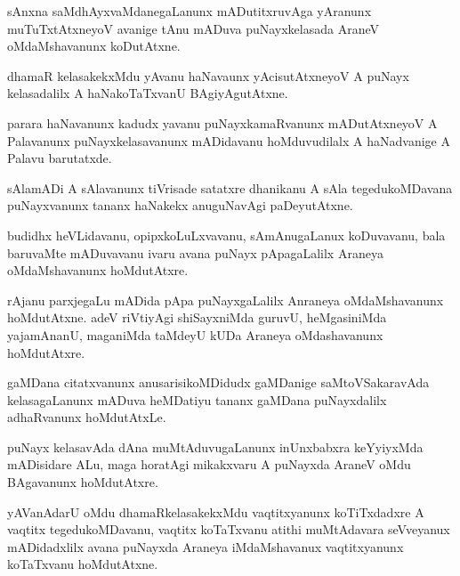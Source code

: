 \documentclass{article}
\begin{document}
\begin{mn}%
sAnxna saMdhAyxvaMdanegaLanunx mADutitxruvAga yAranunx muTuTxtAtxneyoV avanige tAnu mADuva 
puNayxkelasada AraneV oMdaMshavanunx koDutAtxne.
\end{mn}

\begin{mn}%
dhamaR kelasakekxMdu yAvanu haNavaunx yAcisutAtxneyoV A puNayx kelasadalilx A haNakoTaTxvanU 
BAgiyAgutAtxne.
\end{mn}

\begin{mn}%
parara haNavanunx kadudx yavanu puNayxkamaRvanunx mADutAtxneyoV A Palavanunx puNayxkelasavanunx 
mADidavanu hoMduvudilalx A haNadvanige A Palavu barutatxde.
\end{mn}

\begin{mn}%
sAlamADi A sAlavanunx tiVrisade satatxre dhanikanu A sAla tegedukoMDavana puNayxvanunx tananx 
haNakekx anuguNavAgi paDeyutAtxne.
\end{mn}

\begin{mn}%
budidhx heVLidavanu, opipxkoLuLxvavanu, sAmAnugaLanux koDuvavanu, bala baruvaMte mADuvavanu ivaru 
avana puNayx pApagaLalilx Araneya oMdaMshavanunx hoMdutAtxre.
\end{mn}

\begin{mn}%
rAjanu parxjegaLu mADida pApa puNayxgaLalilx Anraneya oMdaMshavanunx hoMdutAtxne. adeV riVtiyAgi 
shiSayxniMda guruvU, heMgasiniMda yajamAnanU, maganiMda taMdeyU kUDa Araneya oMdashavanunx 
hoMdutAtxre.
\end{mn}

\begin{mn}%
gaMDana citatxvanunx anusarisikoMDidudx gaMDanige saMtoVSakaravAda kelasagaLanunx mADuva heMDatiyu 
tananx gaMDana puNayxdalilx adhaRvanunx hoMdutAtxLe.
\end{mn}

\begin{mn}%
puNayx kelasavAda dAna muMtAduvugaLanunx inUnxbabxra keYyiyxMda mADisidare ALu, maga horatAgi 
mikakxvaru A puNayxda AraneV oMdu BAgavanunx hoMdutAtxre.
\end{mn}

\begin{mn}%
yAVanAdarU oMdu dhamaRkelasakekxMdu vaqtitxyanunx koTiTxdadxre A vaqtitx tegedukoMDavanu, vaqtitx 
koTaTxvanu atithi muMtAdavara seVveyanux mADidadxlilx avana puNayxda Araneya iMdaMshavanux 
vaqtitxyanunx koTaTxvanu hoMdutAtxne.
\end{mn}
\end{document}
